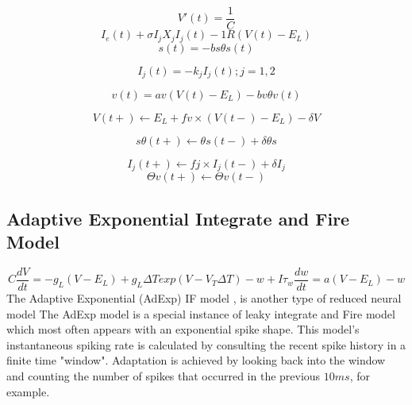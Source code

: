 \begin{equation}
V \prime (t)=\frac{1}{C} 
\end{equation}
\begin{equation}
I_{e}(t) + \sigma I_{j}X_{j}I_{j}(t) -1R(V (t)- E_{L})  \end{equation}
\begin{equation} 
s(t) = -bs \theta s(t)  
\end{equation}

\begin{equation}
I_{j}(t) = -k_{j} I_{j} (t); j = 1, 2  
\end{equation}

\begin{equation}
 v(t) = av(V (t) - E_{L}) - bv\theta v(t) 
\end{equation}

\begin{equation}
V (t+) \leftarrow E_{L} + fv \times (V (t-) - E_{L}) - \delta V 
\end{equation}

\begin{equation}
s \theta (t+) \leftarrow \theta s(t-) + \delta \theta s 
\end{equation}

\begin{equation}
I_{j} (t+) \leftarrow fj \times I_{j} (t-) + \delta I_{j}
\end{equation}
\begin{equation}
\Theta v (t+) \leftarrow \Theta v(t-) 
\end{equation}

\subsection{Adaptive Exponential Integrate and Fire Model}
\begin{displaymath}
 C\frac{dV}{dt}=-g_{L}(V-E_{L})+
g_{L} \Delta Texp(V-V_{T} \Delta T)-w+I 
\tau_{w}\frac{dw}{dt} = a(V-E_{L})-w 
\end{displaymath}
The Adaptive Exponential (AdExp) IF model \citep{brette2005adaptive}, is another type of reduced neural model
The AdExp model is a special instance of leaky integrate and Fire model which most often appears with an exponential spike shape.
This model's instantaneous spiking rate is calculated by consulting the recent spike history in a finite time "window". 
Adaptation is achieved by looking back into the window and counting the number of spikes that occurred in the previous $10ms$, for example. 
